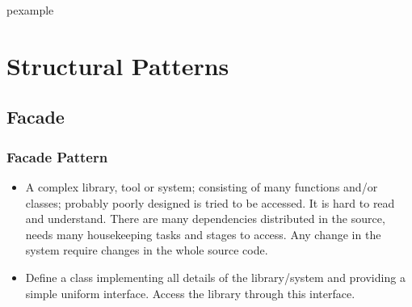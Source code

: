 \documentclass[trans,compress,xcolor=table]{beamer}
\begin{document}
\begin{frame}
\begin{beamercolorbox}{pexample}
\codefactory
\end{beamercolorbox}
\end{frame}

\section{Structural Patterns}
\subsection{Facade}
\begin{frame}
\frametitle{Facade Pattern}
\begin{itemize}
\item {} A complex library, tool or system;
	consisting of many functions and/or classes; probably
	poorly designed
	is tried to be accessed. It is hard to read and understand. 
	There are many dependencies distributed in the source,  needs
	many housekeeping tasks and stages to access. Any change
	in the system require changes in the whole source code.
\item {}
	Define a class implementing all details of the 
	library/system and providing a simple uniform interface. Access
	the library through this interface.
\end{itemize}
\end{frame}
\end{document}
